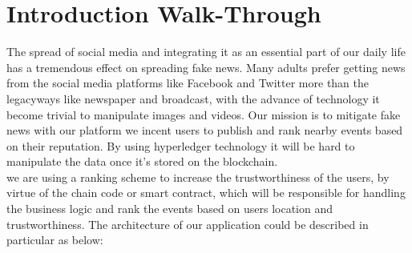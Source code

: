 	\section{Introduction Walk-Through}
	The spread of social media and integrating it as an essential part of our daily life has a tremendous effect on spreading fake news. Many adults prefer getting news from the social media platforms like Facebook and Twitter more than the legacyways like newspaper and broadcast, with the advance of technology it become trivial to manipulate images and videos.   
	Our mission is to mitigate fake news with our platform we incent users to publish and rank nearby events based on their reputation. By using hyperledger technology it will be hard to manipulate the data once it's stored on the blockchain.\\ we are using a ranking scheme to increase the trustworthiness of the users, by virtue of the chain code or smart contract, which will be responsible for handling the business logic and rank the events based on users location and  trustworthiness. The architecture of our application could be described in particular as below: 	 

